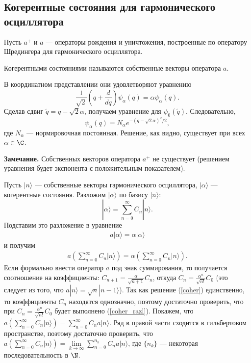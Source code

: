 \documentclass[a4paper
]{article}
\begin{document}
\subsection{Когерентные состояния для гармонического осциллятора}
Пусть $a^+$ и $a$ --- операторы рождения и уничтожения, построенные
по оператору Шредингера для гармонического осциллятора.
\begin{Def}
Когерентными состояниями называются собственные векторы оператора $a$.
\end{Def}
В координатном представлении они удовлетворяют уравнению
$$\frac{1}{\sqrt{2}}\left(q+\frac{d}{dq}\right)\psi_\alpha(q)=\alpha
\psi_\alpha(q).$$
Сделав сдвиг $\tilde q=q-\sqrt{2}\alpha$, получаем уравнение для $\psi_0
(\tilde q)$. Следовательно,
$$\psi_\alpha(q)=N_\alpha e^{-(q-\sqrt{2}\alpha)^2/2},$$ где $N_\alpha$ ---
нормировочная постоянная. Решение, как видно, существует при всех
$\alpha\in \C$. \par
{\bf Замечание.} Собственных векторов оператора $a^+$ не существует
(решением уравнения будет экспонента с положительным показателем). \par
Пусть $|n\rangle$ --- собственные векторы гармонического осциллятора,
$|\alpha\rangle$ --- когерентные состояния. Разложим $|\alpha\rangle$
по базису $|n\rangle$: $$|\alpha\rangle=\sum\limits_{n=0}^\infty
C_n|n\rangle.$$
Подставим это разложение в уравнение
\begin{align}
\label{coher}
a|\alpha\rangle=\alpha|\alpha\rangle
\end{align}
и получим
\begin{align}
\label{coher_razl}
a\left(\sum\limits_{n=0}^\infty C_n|n\rangle\right)=\alpha
\left(\sum\limits_{n=0}^\infty C_n|n\rangle\right).
\end{align}
Если формально внести оператор $a$ под знак суммирования, то получается
соотношение на коэффициенты: $C_{n+1}=\frac{\alpha}{\sqrt{n+1}}C_n$,
откуда $C_n=\frac{\alpha^n}{\sqrt{n!}}C_0$ (это следует из того, что
$a|n\rangle=\sqrt{n}|n-1\rangle$). Так как решение (\ref{coher})
единственно, то коэффициенты $C_n$ находятся однозначно, поэтому
достаточно проверить, что при $C_n=\frac{\alpha^n}{\sqrt{n!}}C_0$ будет
выполнено (\ref{coher_razl}). Покажем, что $a\left(\sum\limits_{n=0}^\infty
C_n|n\rangle\right)=\sum\limits_{n=0}^\infty C_na|n\rangle$. Ряд в
правой части сходится в гильбертовом пространстве, поэтому достаточно
проверить, что $a\left(\sum\limits_{n=0}^\infty C_n|n\rangle\right)=\lim\limits
_{k\rightarrow\infty}\sum\limits_{n=0}^{n_k}C_na|n\rangle$, где
$\{n_k\}$ --- некоторая последовательность в $\N$. \par
\end{document}
